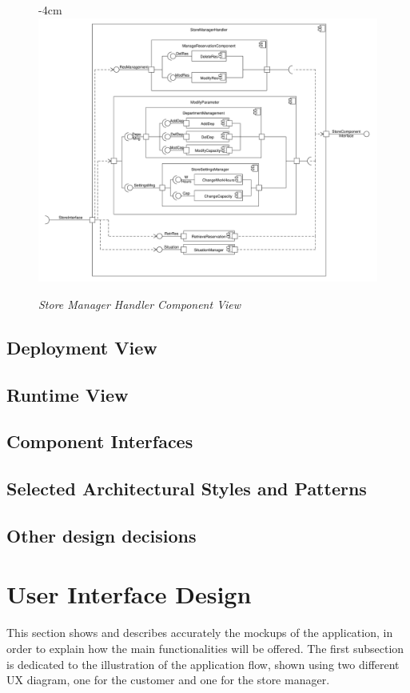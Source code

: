 \documentclass{article}
\begin{document}
		\begin{figure}[H]
			\begin{adjustwidth} {-4cm}{}
				\centering
				\includegraphics[scale=0.45]{Component Diagrams/StoreManagerHandlerComponentView.pdf}\\
			\end{adjustwidth}
			\caption{\emph{Store Manager Handler Component View}}
		\end{figure}
		\newpage
	\subsection{Deployment View}
	\subsection{Runtime View}
	\subsection{Component Interfaces}
	\subsection{Selected Architectural Styles and Patterns}
	\subsection{Other design decisions}

\section{User Interface Design}
This section shows and describes accurately the mockups of the application, in order to explain how the main functionalities will be offered. The first subsection is dedicated to the illustration of the application flow, shown using two different UX diagram, one for the customer and one for the store manager.
\end{document}

